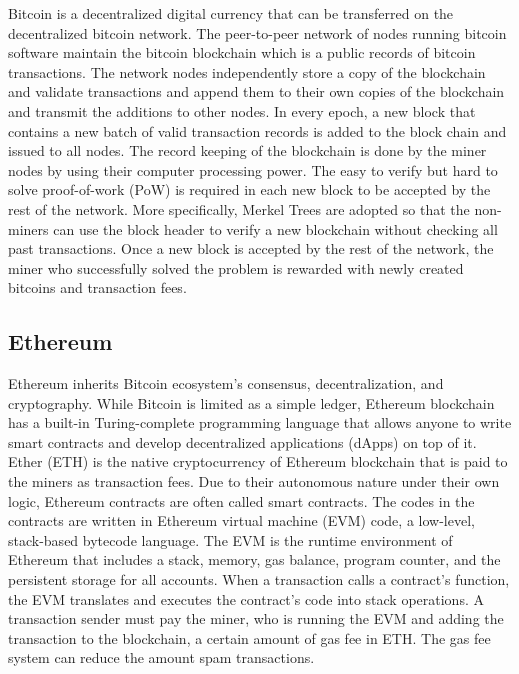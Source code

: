 \documentclass[11pt,letterpaper]{article}
\begin{document}
Bitcoin is a decentralized digital currency that can be transferred on the decentralized bitcoin network. The peer-to-peer network of nodes running bitcoin software maintain the bitcoin blockchain which is a public records of bitcoin transactions. The network nodes independently store a copy of the blockchain and validate transactions and append them to their own copies of the blockchain and transmit the additions to other nodes. In every epoch, a new block that contains a new batch of valid transaction records is added to the block chain and issued to all nodes. The record keeping of the blockchain is done by the miner nodes by using their computer processing power. The easy to verify but hard to solve proof-of-work (PoW) is required in each new block to be accepted by the rest of the network. More specifically, Merkel Trees are adopted so that the non-miners can use the block header to verify a new blockchain without checking all past transactions. Once a new block is accepted by the rest of the network, the  miner who successfully solved the problem is rewarded with newly created bitcoins and transaction fees.

\subsection{Ethereum}

Ethereum inherits Bitcoin ecosystem's consensus, decentralization, and cryptography. While Bitcoin is limited as a simple ledger, Ethereum blockchain has a built-in Turing-complete programming language that allows anyone to write smart contracts and develop decentralized applications (dApps) on top of it. Ether (ETH) is the native cryptocurrency of Ethereum blockchain that is paid to the miners as transaction fees. Due to their autonomous nature under their own logic, Ethereum contracts are often called smart contracts. The codes in the contracts are written in Ethereum virtual machine (EVM) code, a low-level, stack-based bytecode language. The EVM is the runtime environment of Ethereum that includes a stack, memory, gas balance, program counter, and the persistent storage for all accounts. When a transaction calls a contract's function, the EVM translates and executes the contract's code into stack operations. A transaction sender must pay the miner, who is running the EVM and adding the transaction to the blockchain, a certain amount of gas fee in ETH. The gas fee system can reduce the amount spam transactions.
\end{document}
